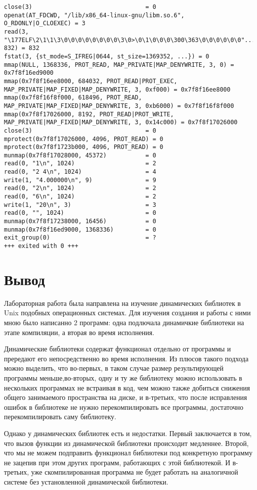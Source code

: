 \documentclass[pdf, unicode, 12pt, a4paper,oneside,fleqn]{article}
\begin{document}
{\begin{verbatim}
close(3)                                = 0
openat(AT_FDCWD, "/lib/x86_64-linux-gnu/libm.so.6", O_RDONLY|O_CLOEXEC) = 3
read(3, "\177ELF\2\1\1\3\0\0\0\0\0\0\0\0\3\0>\0\1\0\0\0\300\363\0\0\0\0\0\0"..., 832) = 832
fstat(3, {st_mode=S_IFREG|0644, st_size=1369352, ...}) = 0
mmap(NULL, 1368336, PROT_READ, MAP_PRIVATE|MAP_DENYWRITE, 3, 0) = 0x7f8f16ed9000
mmap(0x7f8f16ee8000, 684032, PROT_READ|PROT_EXEC, MAP_PRIVATE|MAP_FIXED|MAP_DENYWRITE, 3, 0xf000) = 0x7f8f16ee8000
mmap(0x7f8f16f8f000, 618496, PROT_READ, MAP_PRIVATE|MAP_FIXED|MAP_DENYWRITE, 3, 0xb6000) = 0x7f8f16f8f000
mmap(0x7f8f17026000, 8192, PROT_READ|PROT_WRITE, MAP_PRIVATE|MAP_FIXED|MAP_DENYWRITE, 3, 0x14c000) = 0x7f8f17026000
close(3)                                = 0
mprotect(0x7f8f17026000, 4096, PROT_READ) = 0
mprotect(0x7f8f1723b000, 4096, PROT_READ) = 0
munmap(0x7f8f17028000, 45372)           = 0
read(0, "1\n", 1024)                    = 2
read(0, "2 4\n", 1024)                  = 4
write(1, "4.000000\n", 9)               = 9
read(0, "2\n", 1024)                    = 2
read(0, "6\n", 1024)                    = 2
write(1, "20\n", 3)                     = 3
read(0, "", 1024)                       = 0
munmap(0x7f8f17238000, 16456)           = 0
munmap(0x7f8f16ed9000, 1368336)         = 0
exit_group(0)                           = ?
+++ exited with 0 +++
\end{verbatim}
}

\pagebreak

\section{Вывод}

Лабораторная работа была направлена на изучение динамических библиотек в Unix подобных операционных
системах. Для изучения создания и работы с ними мною было написанно 2 программ: одна
подлючала динамичкие библиотеки на этапе компиляции, а вторая во время исполнения.

Динамические библиотеки содержат функционал отдельно от программы и прередают его
непосредственно во время исполнения. Из плюсов такого подхода можно выделить, что 
во-первых, в таком случае размер результирующей программы меньше,во-вторых, одну и ту же библиотеку 
можно использовать в нескольких программах не встраивая в код, чем можно также добиться снижения
общего занимаемого пространства на диске, и в-третьих, что после исправления ошибок
в библиотеке не нужно перекомпилировать все программы, достаточно перекомпилировать саму библиотеку.

Однако у динамических библиотек есть и недостатки. Первый заключается в том, что
вызов функции из динамической библиотеки происходит медленнее. Второй, что
мы не можем подправить функционал библиотеки под конкретную программу не зацепив
при этом других программ, работающих с этой библиотекой. И в-третьих, уже скомпилированная
программа не будет работать на аналогичной системе без установленной динамической библиотеки.
\end{document}
